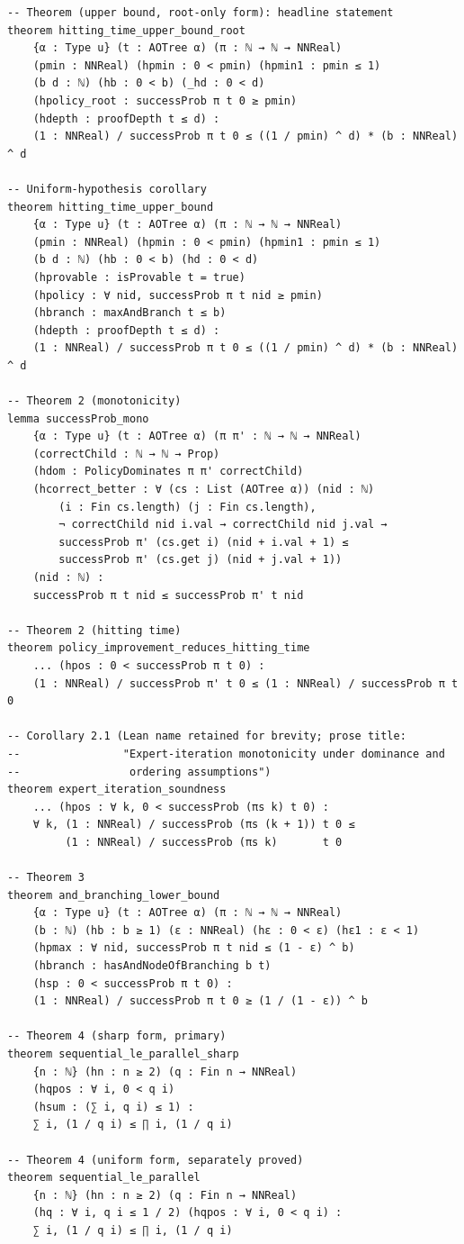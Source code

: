 \documentclass[reqno,11pt]{amsart}
\theoremstyle{plain}
\theoremstyle{definition}
\theoremstyle{remark}
\begin{document}
\begin{lstlisting}[style=lean]
-- Theorem (upper bound, root-only form): headline statement
theorem hitting_time_upper_bound_root
    {α : Type u} (t : AOTree α) (π : ℕ → ℕ → NNReal)
    (pmin : NNReal) (hpmin : 0 < pmin) (hpmin1 : pmin ≤ 1)
    (b d : ℕ) (hb : 0 < b) (_hd : 0 < d)
    (hpolicy_root : successProb π t 0 ≥ pmin)
    (hdepth : proofDepth t ≤ d) :
    (1 : NNReal) / successProb π t 0 ≤ ((1 / pmin) ^ d) * (b : NNReal) ^ d

-- Uniform-hypothesis corollary
theorem hitting_time_upper_bound
    {α : Type u} (t : AOTree α) (π : ℕ → ℕ → NNReal)
    (pmin : NNReal) (hpmin : 0 < pmin) (hpmin1 : pmin ≤ 1)
    (b d : ℕ) (hb : 0 < b) (hd : 0 < d)
    (hprovable : isProvable t = true)
    (hpolicy : ∀ nid, successProb π t nid ≥ pmin)
    (hbranch : maxAndBranch t ≤ b)
    (hdepth : proofDepth t ≤ d) :
    (1 : NNReal) / successProb π t 0 ≤ ((1 / pmin) ^ d) * (b : NNReal) ^ d

-- Theorem 2 (monotonicity)
lemma successProb_mono
    {α : Type u} (t : AOTree α) (π π' : ℕ → ℕ → NNReal)
    (correctChild : ℕ → ℕ → Prop)
    (hdom : PolicyDominates π π' correctChild)
    (hcorrect_better : ∀ (cs : List (AOTree α)) (nid : ℕ)
        (i : Fin cs.length) (j : Fin cs.length),
        ¬ correctChild nid i.val → correctChild nid j.val →
        successProb π' (cs.get i) (nid + i.val + 1) ≤
        successProb π' (cs.get j) (nid + j.val + 1))
    (nid : ℕ) :
    successProb π t nid ≤ successProb π' t nid

-- Theorem 2 (hitting time)
theorem policy_improvement_reduces_hitting_time
    ... (hpos : 0 < successProb π t 0) :
    (1 : NNReal) / successProb π' t 0 ≤ (1 : NNReal) / successProb π t 0

-- Corollary 2.1 (Lean name retained for brevity; prose title:
--                "Expert-iteration monotonicity under dominance and
--                 ordering assumptions")
theorem expert_iteration_soundness
    ... (hpos : ∀ k, 0 < successProb (πs k) t 0) :
    ∀ k, (1 : NNReal) / successProb (πs (k + 1)) t 0 ≤
         (1 : NNReal) / successProb (πs k)       t 0

-- Theorem 3
theorem and_branching_lower_bound
    {α : Type u} (t : AOTree α) (π : ℕ → ℕ → NNReal)
    (b : ℕ) (hb : b ≥ 1) (ε : NNReal) (hε : 0 < ε) (hε1 : ε < 1)
    (hpmax : ∀ nid, successProb π t nid ≤ (1 - ε) ^ b)
    (hbranch : hasAndNodeOfBranching b t)
    (hsp : 0 < successProb π t 0) :
    (1 : NNReal) / successProb π t 0 ≥ (1 / (1 - ε)) ^ b

-- Theorem 4 (sharp form, primary)
theorem sequential_le_parallel_sharp
    {n : ℕ} (hn : n ≥ 2) (q : Fin n → NNReal)
    (hqpos : ∀ i, 0 < q i)
    (hsum : (∑ i, q i) ≤ 1) :
    ∑ i, (1 / q i) ≤ ∏ i, (1 / q i)

-- Theorem 4 (uniform form, separately proved)
theorem sequential_le_parallel
    {n : ℕ} (hn : n ≥ 2) (q : Fin n → NNReal)
    (hq : ∀ i, q i ≤ 1 / 2) (hqpos : ∀ i, 0 < q i) :
    ∑ i, (1 / q i) ≤ ∏ i, (1 / q i)
\end{lstlisting}



\end{document}
